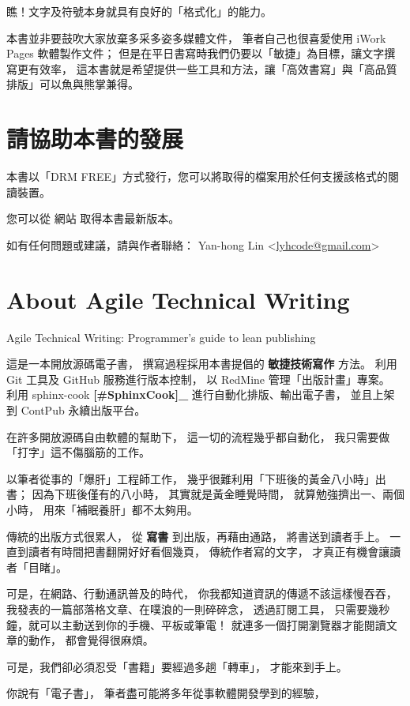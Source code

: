 \documentclass[a4paper,12pt,english]{sphinxmanual}
\begin{document}
瞧！文字及符號本身就具有良好的「格式化」的能力。

本書並非要鼓吹大家放棄多采多姿多媒體文件，
筆者自己也很喜愛使用 iWork Pages 軟體製作文件；
但是在平日書寫時我們仍要以「敏捷」為目標，讓文字撰寫更有效率，
這本書就是希望提供一些工具和方法，讓「高效書寫」與「高品質排版」可以魚與熊掌兼得。


\chapter{請協助本書的發展}
\label{copyright::doc}\label{copyright:id1}
本書以「DRM FREE」方式發行，您可以將取得的檔案用於任何支援該格式的閱讀裝置。

您可以從 網站 取得本書最新版本。

如有任何問題或建議，請與作者聯絡： Yan-hong Lin \textless{}\href{mailto:lyhcode@gmail.com}{lyhcode@gmail.com}\textgreater{}


\chapter{About Agile Technical Writing}
\label{README:about-agile-technical-writing}\label{README::doc}
Agile Technical Writing: Programmer's guide to lean publishing

這是一本開放源碼電子書，
撰寫過程採用本書提倡的 \textbf{敏捷技術寫作} 方法。
利用 Git 工具及 GitHub 服務進行版本控制，
以 RedMine 管理「出版計畫」專案。
利用 sphinx-cook {\color{red}\bfseries{}{[}\#SphinxCook{]}\_} 進行自動化排版、輸出電子書，
並且上架到 ContPub 永續出版平台。

在許多開放源碼自由軟體的幫助下，
這一切的流程幾乎都自動化，
我只需要做「打字」這不傷腦筋的工作。

以筆者從事的「爆肝」工程師工作，
幾乎很難利用「下班後的黃金八小時」出書；
因為下班後僅有的八小時，
其實就是黃金睡覺時間，
就算勉強擠出一、兩個小時，
用來「補眠養肝」都不太夠用。

傳統的出版方式很累人，
從 \textbf{寫書} 到出版，再藉由通路，
將書送到讀者手上。
一直到讀者有時間把書翻開好好看個幾頁，
傳統作者寫的文字，
才真正有機會讓讀者「目睹」。

可是，在網路、行動通訊普及的時代，
你我都知道資訊的傳遞不該這樣慢吞吞，
我發表的一篇部落格文章、在噗浪的一則碎碎念，
透過訂閱工具，
只需要幾秒鐘，就可以主動送到你的手機、平板或筆電！
就連多一個打開瀏覽器才能閱讀文章的動作，
都會覺得很麻煩。

可是，我們卻必須忍受「書籍」要經過多趟「轉車」，
才能來到手上。

你說有「電子書」，
筆者盡可能將多年從事軟體開發學到的經驗，
\end{document}
